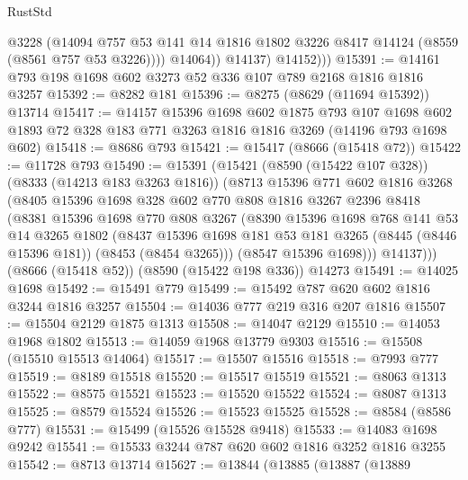 \begin{lexlean}{RustStd}
\begin{coremodule}
                  @3228
                  (@14094
                    @757
                    @53
                    @141
                    @14
                    @1816
                    @1802
                    @3226
                    @8417
                    @14124
                    (@8559 (@8561 @757 @53 @3226))))
                @14064))
            @14137)
          @14152)))
@15391 := @14161 @793 @198 @1698 @602 @3273 @52 @336 @107 @789 @2168 @1816 @1816 @3257
@15392 := @8282 @181
@15396 := @8275 (@8629 (@11694 @15392)) @13714
@15417 := @14157
    @15396
    @1698
    @602
    @1875
    @793
    @107
    @1698
    @602
    @1893
    @72
    @328
    @183
    @771
    @3263
    @1816
    @1816
    @3269
    (@14196 @793 @1698 @602)
@15418 := @8686 @793
@15421 := @15417 (@8666 (@15418 @72))
@15422 := @11728 @793
@15490 := @15391
    (@15421
      (@8590 (@15422 @107 @328))
      (@8333 (@14213 @183 @3263 @1816))
      (@8713
        @15396
        @771
        @602
        @1816
        @3268
        (@8405
          @15396
          @1698
          @328
          @602
          @770
          @808
          @1816
          @3267
          @2396
          @8418
          (@8381
            @15396
            @1698
            @770
            @808
            @3267
            (@8390
              @15396
              @1698
              @768
              @141
              @53
              @14
              @3265
              @1802
              (@8437
                @15396
                @1698
                @181
                @53
                @181
                @3265
                (@8445 (@8446 @15396 @181))
                (@8453 (@8454 @3265)))
              (@8547 @15396 @1698)))
          @14137)))
    (@8666 (@15418 @52))
    (@8590 (@15422 @198 @336))
    @14273
@15491 := @14025 @1698
@15492 := @15491 @779
@15499 := @15492 @787 @620 @602 @1816 @3244 @1816 @3257
@15504 := @14036 @777 @219 @316 @207 @1816
@15507 := @15504 @2129 @1875 @1313
@15508 := @14047 @2129
@15510 := @14053 @1968 @1802
@15513 := @14059 @1968 @13779 @9303
@15516 := @15508 (@15510 @15513 @14064)
@15517 := @15507 @15516
@15518 := @7993 @777
@15519 := @8189 @15518
@15520 := @15517 @15519
@15521 := @8063 @1313
@15522 := @8575 @15521
@15523 := @15520 @15522
@15524 := @8087 @1313
@15525 := @8579 @15524
@15526 := @15523 @15525
@15528 := @8584 (@8586 @777)
@15531 := @15499 (@15526 @15528 @9418)
@15533 := @14083 @1698 @9242
@15541 := @15533 @3244 @787 @620 @602 @1816 @3252 @1816 @3255
@15542 := @8713 @13714
@15627 := @13844
    (@13885
      (@13887
        (@13889

\end{coremodule}
\end{lexlean}
